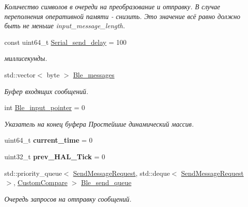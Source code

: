 \begin{DoxyCompactItemize}
\begin{DoxyCompactList}\small\item\em Количество символов в очереди на преобразование и отправку.  В случае переполнения оперативной памяти -\/ снизить. Это значение всё равно должно быть не меньше input\+\_\+message\+\_\+length. \end{DoxyCompactList}\item 
\mbox{\label{classBleConverter_ab8e7df0a0789cc885f22fc9cd5e24983}} 
const uint64\+\_\+t \hyperlink{classBleConverter_ab8e7df0a0789cc885f22fc9cd5e24983}{Serial\+\_\+send\+\_\+delay} = 100
\begin{DoxyCompactList}\small\item\em миллисекунды. \end{DoxyCompactList}\item 
\mbox{\label{classBleConverter_adf91c547fda6b9a0a3e4d521a44050c4}} 
std\+::vector$<$ byte $>$ \hyperlink{classBleConverter_adf91c547fda6b9a0a3e4d521a44050c4}{Ble\+\_\+messages}
\begin{DoxyCompactList}\small\item\em Буфер входящих сообщений. \end{DoxyCompactList}\item 
\mbox{\label{classBleConverter_a84fbadc2b74045acb04c19a894de6fa8}} 
int \hyperlink{classBleConverter_a84fbadc2b74045acb04c19a894de6fa8}{Ble\+\_\+input\+\_\+pointer} = 0
\begin{DoxyCompactList}\small\item\em Указатель на конец буфера  Простейшие динамический массив. \end{DoxyCompactList}\item 
\mbox{\label{classBleConverter_a57c959ab369b9118556104000c36f29a}} 
uint64\+\_\+t {\bfseries current\+\_\+time} = 0
\item 
\mbox{\label{classBleConverter_a6baed44f9952aa6adfd16963ed74007b}} 
uint32\+\_\+t {\bfseries prev\+\_\+\+H\+A\+L\+\_\+\+Tick} = 0
\item 
\mbox{\label{classBleConverter_a4ed355811c8a8dae18af243e0e9775e8}} 
std\+::priority\+\_\+queue$<$ \hyperlink{classSendMessageRequest}{Send\+Message\+Request}, std\+::deque$<$ \hyperlink{classSendMessageRequest}{Send\+Message\+Request} $>$, \hyperlink{structBleConverter_1_1CustomCompare}{Custom\+Compare} $>$ \hyperlink{classBleConverter_a4ed355811c8a8dae18af243e0e9775e8}{Ble\+\_\+send\+\_\+queue}
\begin{DoxyCompactList}\small\item\em Очередь запросов на отправку сообщений. \end{DoxyCompactList}\end{DoxyCompactItemize}



